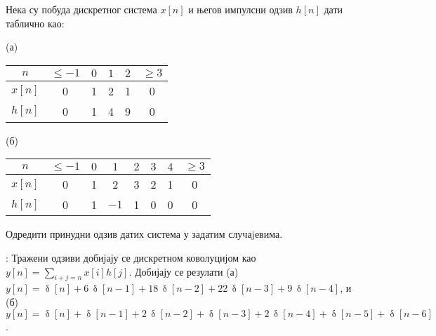 \PID
Нека су побуда дискретног система $x[n]$ и његов импулсни одзив $h[n]$ дати таблично као:
\begin{center}
(а)
\begin{minipage}[c]{0.3\textwidth}
    \begin{tabular}{c||ccccc}
        \hline
        $n$ & $\leq-1$ & $0$ & $1$ & $2$ & $\geq 3$ \\ \hline
        $x[n]$ & 0 & 1 & 2 & 1 & 0 \\ \hline
        $h[n]$ & 0 & 1 & 4 & 9 & 0 \\ \hline
    \end{tabular}    
\end{minipage}
\qquad\qquad
(б)
\begin{minipage}[c]{0.4\textwidth}
    \begin{tabular}{c||ccccccc}
        \hline
        $n$ & $\leq-1$ & $0$ & $1$ & $2$ & $3$ & $4$ & $\geq 3$ \\ \hline
        $x[n]$ & 0 & 1 & 2 & 3 & 2 & 1 & 0 \\ \hline
        $h[n]$ & 0 & 1 & $-1$ & 1 & 0 & 0 & 0 \\ \hline
    \end{tabular}    
\end{minipage}
\hfill
\end{center}
Одредити принудни одзив датих система у задатим случаjевима.

: Тражени одзиви добијају се дискретном коволуцијом као 
$y[n] = \sum_{i+j = n} x[i] h[j]$. Добијају се резулати
(а) $y[n] = \updelta[n] + 6\,\updelta[n-1]  + 18\,\updelta[n-2] + 22\,\updelta[n-3] + 9\,\updelta[n-4]$, 
и 
(б) $y[n] = \updelta[n] + \updelta[n-1] +  2\,\updelta[n-2] + \updelta[n-3] +  2\,\updelta[n-4] +  \updelta[n-5] +  \updelta[n-6]$.

